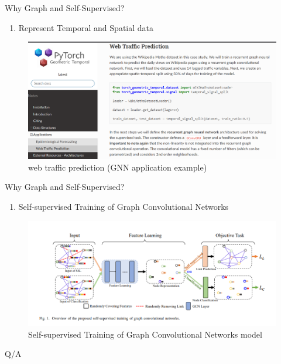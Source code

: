 \documentclass{beamer}
\newcounter{saveenumi}
\newcommand{\seti}{\setcounter{saveenumi}{\value{enumi}}}
\newcommand{\conti}{\setcounter{enumi}{\value{saveenumi}}}
\begin{document}
	\begin{frame}[t]{Why Graph and Self-Supervised?}
		\begin{enumerate}
			\conti
			\item Represent Temporal and Spatial data
			\seti
		\end{enumerate}
	\begin{figure}
		\includegraphics[scale=0.3]{web.png}
		\caption{web traffic prediction (GNN application example)}
	\end{figure}
	\end{frame}

	\begin{frame}[t]{Why Graph and Self-Supervised?}
		\begin{enumerate}
			\conti
			\item Self-supervised Training of Graph Convolutional Networks

		\end{enumerate}
		\begin{figure}
			\includegraphics[scale=0.4]{self_graph.png}
			\caption{Self-supervised Training of Graph Convolutional Networks model }
		\end{figure}
	\end{frame}

	\begin{frame}[standout]
		Q/A
	\end{frame}
\end{document}
